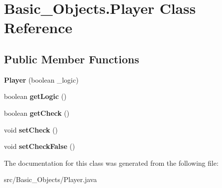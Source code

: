 \hypertarget{class_basic___objects_1_1_player}{\section{Basic\-\_\-\-Objects.\-Player Class Reference}
\label{class_basic___objects_1_1_player}
}
\subsection*{Public Member Functions}
\begin{DoxyCompactItemize}
\item 
\hypertarget{class_basic___objects_1_1_player_af7e6503b73e6881ce72038623245306d}{{\bfseries Player} (boolean \-\_\-logic)}\label{class_basic___objects_1_1_player_af7e6503b73e6881ce72038623245306d}

\item 
\hypertarget{class_basic___objects_1_1_player_afba3554e21a1c306bb99e8f65a73b3f4}{boolean {\bfseries get\-Logic} ()}\label{class_basic___objects_1_1_player_afba3554e21a1c306bb99e8f65a73b3f4}

\item 
\hypertarget{class_basic___objects_1_1_player_a95df7c4b31416cb228711eb4451edf3f}{boolean {\bfseries get\-Check} ()}\label{class_basic___objects_1_1_player_a95df7c4b31416cb228711eb4451edf3f}

\item 
\hypertarget{class_basic___objects_1_1_player_a4fa211cc84a1c48ab219f95bb948ee95}{void {\bfseries set\-Check} ()}\label{class_basic___objects_1_1_player_a4fa211cc84a1c48ab219f95bb948ee95}

\item 
\hypertarget{class_basic___objects_1_1_player_a1bfd2ce47e3d904ee0a3e5d8b540b648}{void {\bfseries set\-Check\-False} ()}\label{class_basic___objects_1_1_player_a1bfd2ce47e3d904ee0a3e5d8b540b648}

\end{DoxyCompactItemize}


The documentation for this class was generated from the following file\-:\begin{DoxyCompactItemize}
\item 
src/\-Basic\-\_\-\-Objects/Player.\-java\end{DoxyCompactItemize}
